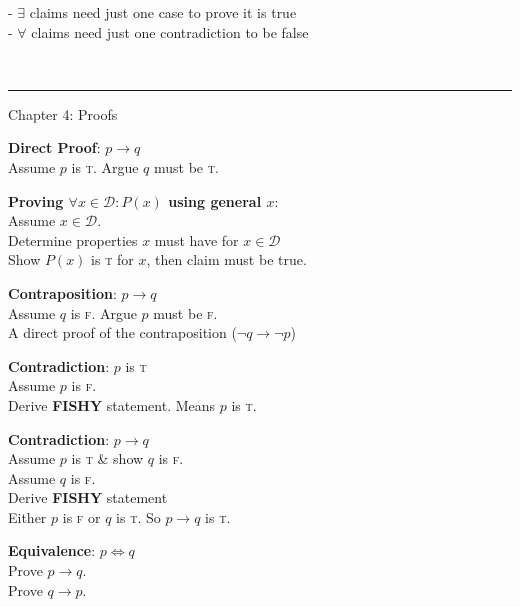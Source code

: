 \documentclass[12pt, letterpaper]{article}
\begin{document}
\begin{multicols}{2}
- $\exists$ claims need just one case to prove it is true \\
- $\forall$ claims need just one contradiction to be false

 \\

\rule[0.5ex]{\linewidth}{1pt}

Chapter 4: Proofs

\textbf{Direct Proof}: $p \rightarrow q$ \\
\null \quad Assume $p$ is \textsc{t}. Argue $q$ must be \textsc{t}.

\textbf{Proving $\forall x \in \mathcal{D} : P(x)$ using general $x$}:\\
\null \quad Assume $x \in \mathcal{D}$. \\
\null \quad Determine properties $x$ must have for $x \in \mathcal{D}$ \\
\null \quad Show $P(x)$ is \textsc{t} for $x$, then claim must be true.

\textbf{Contraposition}: $p \rightarrow q$ \\
\null \quad Assume $q$ is \textsc{f}. Argue $p$ must be \textsc{f}. \\
\null \quad A direct proof of the contraposition ($\neg q \rightarrow \neg p$)

\textbf{Contradiction}: $p$ is \textsc{t} \\
\null \quad Assume $p$ is \textsc{f}. \\
\null \quad Derive \textbf{FISHY} statement. Means $p$ is \textsc{t}.

\textbf{Contradiction}: $p \rightarrow q$ \\
\null \quad Assume $p$ is \textsc{t} \& show $q$ is \textsc{f}. \\
\null \quad Assume $q$ is \textsc{f}. \\
\null \quad Derive \textbf{FISHY} statement \\
\null \quad Either $p$ is \textsc{f} or $q$ is \textsc{t}.
  So $p \rightarrow q$ is \textsc{t}.

\textbf{Equivalence}: $p \iff q$ \\
\null \quad Prove $p \rightarrow q$. \\
\null \quad Prove $q \rightarrow p$.


\end{multicols}
\end{document}
